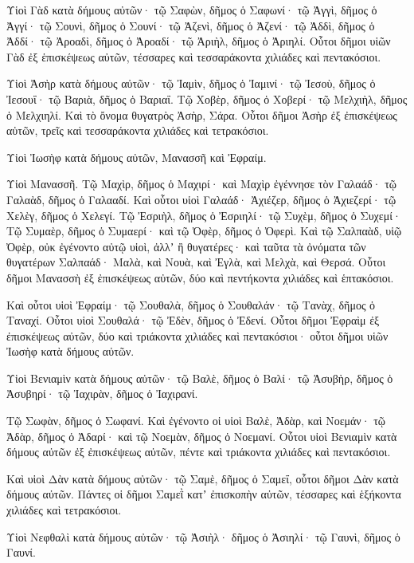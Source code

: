 {\par }{\PP {}Υἱοὶ Γὰδ κατὰ δήμους αὐτῶν· τῷ Σαφὼν, δῆμος ὁ Σαφωνί· τῷ Ἀγγὶ, δῆμος ὁ Ἀγγί· τῷ Σουνὶ, δῆμος ὁ Σουνί·
τῷ Ἀζενὶ, δῆμος ὁ Ἀζενί· τῷ Ἀδδὶ, δῆμος ὁ Ἀδδί·
τῷ Ἀροαδὶ, δῆμος ὁ Ἀροαδί· τῷ Ἀριὴλ, δῆμος ὁ Ἀριηλί.
Οὗτοι δῆμοι υἱῶν Γὰδ ἐξ ἑπισκέψεως αὐτῶν, τέσσαρες καὶ τεσσαράκοντα χιλιάδες καὶ πεντακόσιοι.
\par }{\PP {}Υἱοὶ Ἀσὴρ κατὰ δήμους αὐτῶν· τῷ Ἰαμὶν, δῆμος ὁ Ἰαμινί· τῷ Ἰεσοὺ, δῆμος ὁ Ἰεσουΐ· τῷ Βαριὰ, δῆμος ὁ Βαριαΐ.
Τῷ Χοβὲρ, δῆμος ὁ Χοβερί· τῷ Μελχιὴλ, δῆμος ὁ Μελχιηλί.
Καὶ τὸ ὄνομα θυγατρὸς Ἀσὴρ, Σάρα.
Οὗτοι δῆμοι Ἀσὴρ ἐξ ἐπισκέψεως αὐτῶν, τρεῖς καὶ τεσσαράκοντα χιλιάδες καὶ τετρακόσιοι.
\par }{\PP {}Υἱοὶ Ἰωσὴφ κατὰ δήμους αὐτῶν, Μανασσῆ καὶ Ἐφραίμ.
\par }{\PP {}Υἱοὶ Μανασσῆ. Τῷ Μαχὶρ, δῆμος ὁ Μαχιρί· καὶ Μαχὶρ ἐγέννησε τὸν Γαλαάδ· τῷ Γαλαὰδ, δῆμος ὁ Γαλααδί.
Καὶ οὗτοι υἱοὶ Γαλαάδ· Ἀχιέζερ, δῆμος ὁ Ἀχιεζερί· τῷ Χελὲγ, δῆμος ὁ Χελεγί.
Τῷ Ἐσριὴλ, δῆμος ὁ Ἐσριηλί· τῷ Συχὲμ, δῆμος ὁ Συχεμί·
Τῷ Συμαὲρ, δῆμος ὁ Συμαερί· καὶ τῷ Ὀφὲρ, δῆμος ὁ Ὀφερὶ.
Καὶ τῷ Σαλπαὰδ, υἱῷ Ὀφὲρ, οὐκ ἐγένοντο αὐτῷ υἱοὶ, ἀλλʼ ἢ θυγατέρες· καὶ ταῦτα τὰ ὀνόματα τῶν θυγατέρων Σαλπαάδ· Μαλὰ, καὶ Νουὰ, καὶ Ἐγλὰ, καὶ Μελχὰ, καὶ Θερσά.
Οὗτοι δῆμοι Μανασσὴ ἐξ ἐπισκέψεως αὐτῶν, δύο καὶ πεντήκοντα χιλιάδες καὶ ἑπτακόσιοι.
\par }{\PP {}Καὶ οὗτοι υἱοὶ Ἐφραίμ· τῷ Σουθαλὰ, δῆμος ὁ Σουθαλάν· τῷ Τανὰχ, δῆμος ὁ Ταναχί.
Οὗτοι υἱοὶ Σουθαλά· τῷ Ἐδὲν, δῆμος ὁ Ἐδενί.
Οὗτοι δῆμοι Ἐφραὶμ ἐξ ἐπισκέψεως αὐτῶν, δύο καὶ τριάκοντα χιλιάδες καὶ πεντακόσιοι· οὗτοι δῆμοι υἱῶν Ἰωσὴφ κατὰ δήμους αὐτῶν.
\par }{\PP {}Υἱοὶ Βενιαμὶν κατὰ δήμους αὐτῶν· τῷ Βαλὲ, δῆμος ὁ Βαλί· τῷ Ἀσυβὴρ, δῆμος ὁ Ἀσυβηρί· τῷ Ἰαχιρὰν, δῆμος ὁ Ἰαχιρανί.
\par }{\PP {}Τῷ Σωφὰν, δῆμος ὁ Σωφανί.
Καὶ ἐγένοντο οἱ υἱοὶ Βαλὲ, Ἀδὰρ, καὶ Νοεμάν· τῷ Ἀδὰρ, δῆμος ὁ Ἀδαρί· καὶ τῷ Νοεμὰν, δῆμος ὁ Νοεμανί.
Οὗτοι υἱοὶ Βενιαμὶν κατὰ δήμους αὐτῶν ἐξ ἐπισκέψεως αὐτῶν, πέντε καὶ τριάκοντα χιλιάδες καὶ πεντακόσιοι.
\par }{\PP {}Καὶ υἱοὶ Δὰν κατὰ δήμους αὐτῶν· τῷ Σαμὲ, δῆμος ὁ Σαμεΐ, οὗτοι δῆμοι Δὰν κατὰ δήμους αὐτῶν.
Πάντες οἱ δῆμοι Σαμεῒ κατʼ ἐπισκοπὴν αὐτῶν, τέσσαρες καὶ ἑξήκοντα χιλιάδες καὶ τετρακόσιοι.
\par }{\PP {}Υἱοὶ Νεφθαλὶ κατὰ δήμους αὐτῶν· τῷ Ἀσιὴλ· δῆμος ὁ Ἀσιηλί· τῷ Γαυνὶ, δῆμος ὁ Γαυνί.
}
